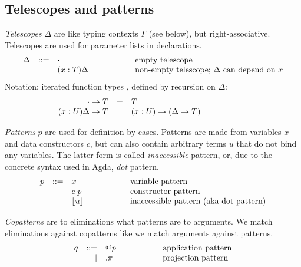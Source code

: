 \documentclass[acmlarge,fleqn]{acmart}\settopmatter{}
\renewcommand{\|}{\mid}
\begin{document}
\subsection{Telescopes and patterns}

\emph{Telescopes} $\Delta$ are like typing contexts $\Gamma$ (see below), but right-associative.
Telescopes are used \eg{} for parameter lists in declarations.
\[
\begin{array}{lrl@{\hspace{2cm}}l}
\Delta &::=& \cempty       & \text{empty telescope} \\
       &  |& (x : T)\Delta & \text{non-empty telescope; $\Delta$ can depend on $x$} \\
\end{array}
\]
Notation: iterated function types , defined by recursion on $\Delta$:
\[
\begin{array}{rrl@{\hspace{2cm}}l}
\cempty \to T       &=& T &\\
(x : U)\Delta \to T &=& (x : U) \to (\Delta \to T) & \\
\end{array}
\]

\emph{Patterns} $p$ are used for definition by cases.
Patterns are made from variables $x$ and data constructors $c$,
but can also contain arbitrary terms $u$ that do not bind any variables.
The latter form is called \emph{inaccessible} pattern, or, due to the
concrete syntax used in Agda, \emph{dot} pattern.
\[
\begin{array}{lrl@{\hspace{2cm}}l}
p &::=& x              &   \text{variable pattern} \\
  & | & c\; \bar{p}    &   \text{constructor pattern} \\
  & | & \dotp u        &   \text{inaccessible pattern (aka dot pattern)} \\
\end{array}
\]

\emph{Copatterns} are to eliminations what patterns are to arguments.
We match eliminations against copatterns like we match arguments against patterns.
\[
\begin{array}{lrl@{\hspace{2cm}}l}
q &::= & @p   & \text{application pattern} \\
  &  | & .\pi & \text{projection  pattern}\\
\end{array}
\]
\end{document}

